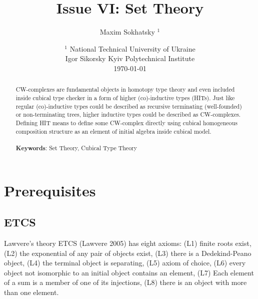 \documentclass{article}
\theoremstyle{definition}
\begin{document}
\title{Issue VI: Set Theory}
\author{Maxim Sokhatsky $^1$}
\date{ $^1$ National Technical University of Ukraine \\
       \small Igor Sikorsky Kyiv Polytechnical Institute \\
       \today }

\maketitle

\begin{abstract}
CW-complexes are fundamental objects in homotopy type theory
and even included inside cubical type checker in a form of
higher (co)-inductive types (HITs).
Just like regular (co)-inductive types could be described as recursive
terminating (well-founded) or non-terminating trees,
higher inductive types could be described as CW-complexes.
Defining HIT means to define some CW-complex
directly using cubical homogeneous composition structure as an
element of initial algebra inside cubical model.
\\
\\
{\bf Keywords}: Set Theory, Cubical Type Theory
\end{abstract}
\tableofcontents

\newpage
\section{Prerequisites}

\subsection{ETCS}
Lawvere’s theory ETCS (Lawvere 2005) has eight axioms:
(L1) finite roots exist,
(L2) the exponential of any pair of objects exist,
(L3) there is a Dedekind-Peano object,
(L4) the terminal object is separating,
(L5) axiom of choice,
(L6) every object not isomorphic to an initial object contains an element,
(L7) Each element of a sum is a member of one of its injections,
(L8) there is an object with more than one element.




\end{document}
